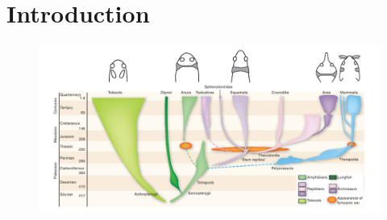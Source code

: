 \chapter{Introduction}\label{introchapter}

\begin{figure}
 \includegraphics[width=1.1\linewidth]{Diagrams/vertebrateearevolution.png}
 \caption[Vertebrate Ear Evolution]{}
 \label{vertebrateearevolution}
\end{figure}